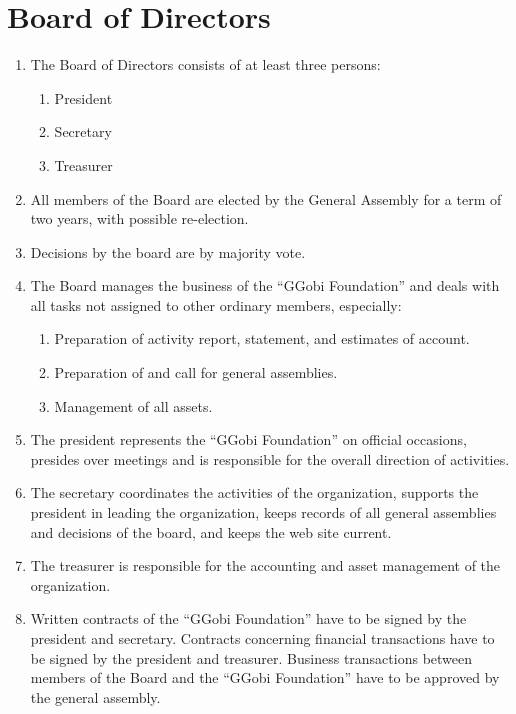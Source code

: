 \documentclass{article}
\begin{document}
\section{Board of Directors}

\begin{enumerate} \itemsep 0in
\item The Board of Directors consists of at least three persons:

\begin{enumerate} \itemsep 0in
\item President
\item Secretary 
\item Treasurer
\end{enumerate}

\item All members of the Board are elected by the General Assembly for a
term of two years, with possible re-election. 
\item Decisions by the board are by majority vote.
\item The Board manages the business of the ``GGobi Foundation'' and
deals with all tasks not assigned to other ordinary members, especially:
\begin{enumerate} \itemsep 0in
\item Preparation of activity report, statement, and estimates of account.
\item Preparation of and call for general assemblies.
\item Management of all assets.
\end{enumerate}
\item The president represents the ``GGobi Foundation'' on official
occasions, presides over meetings and is responsible for the overall
direction of activities.
\item The secretary coordinates the activities of the organization,
supports the president in leading the organization, keeps records
of all general assemblies and decisions of the board, and keeps the
web site current.
\item The treasurer is responsible for the accounting and asset
management of the organization.
\item Written contracts of the ``GGobi Foundation'' have to be signed
by the president and secretary. Contracts concerning financial
transactions have to be signed by the president and
treasurer. Business transactions between members of the Board and the
``GGobi Foundation'' have to be approved by the general assembly.
\end{enumerate}
\end{document}
